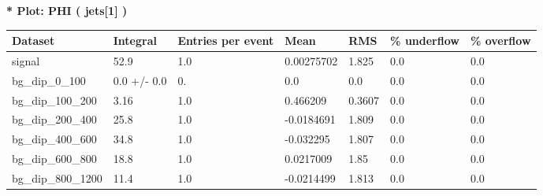\documentclass[a4paper, 10pt]{article}
\begin{document}
\textbf{* Plot: PHI ( jets[1] ) }\\
   \begin{table}[H]
  \begin{center}
    \begin{tabular}{|m{23.0mm}|m{23.0mm}|m{18.0mm}|m{19.0mm}|m{19.0mm}|m{19.0mm}|m{19.0mm}|}
      \hline
      {\cellcolor{yellow}         Dataset}& {\cellcolor{yellow}         Integral}& {\cellcolor{yellow}         Entries per event}& {\cellcolor{yellow}         Mean}& {\cellcolor{yellow}         RMS}& {\cellcolor{yellow}         \% underflow}& {\cellcolor{yellow}         \% overflow}\\
      \hline
      {\cellcolor{white}         signal}& {\cellcolor{white}         52.9}& {\cellcolor{white}         1.0}& {\cellcolor{white}         0.00275702}& {\cellcolor{white}         1.825}& {\cellcolor{green}         0.0}& {\cellcolor{green}         0.0}\\
      \hline
      {\cellcolor{white}         bg\_dip\_0\_100}& {\cellcolor{white}         0.0 +/\-- 0.0}& {\cellcolor{white}         0.}& {\cellcolor{white}         0.0}& {\cellcolor{white}         0.0}& {\cellcolor{green}         0.0}& {\cellcolor{green}         0.0}\\
      \hline
      {\cellcolor{white}         bg\_dip\_100\_200}& {\cellcolor{white}         3.16}& {\cellcolor{white}         1.0}& {\cellcolor{white}         0.466209}& {\cellcolor{white}         0.3607}& {\cellcolor{green}         0.0}& {\cellcolor{green}         0.0}\\
      \hline
      {\cellcolor{white}         bg\_dip\_200\_400}& {\cellcolor{white}         25.8}& {\cellcolor{white}         1.0}& {\cellcolor{white}         -0.0184691}& {\cellcolor{white}         1.809}& {\cellcolor{green}         0.0}& {\cellcolor{green}         0.0}\\
      \hline
      {\cellcolor{white}         bg\_dip\_400\_600}& {\cellcolor{white}         34.8}& {\cellcolor{white}         1.0}& {\cellcolor{white}         -0.032295}& {\cellcolor{white}         1.807}& {\cellcolor{green}         0.0}& {\cellcolor{green}         0.0}\\
      \hline
      {\cellcolor{white}         bg\_dip\_600\_800}& {\cellcolor{white}         18.8}& {\cellcolor{white}         1.0}& {\cellcolor{white}         0.0217009}& {\cellcolor{white}         1.85}& {\cellcolor{green}         0.0}& {\cellcolor{green}         0.0}\\
      \hline
      {\cellcolor{white}         bg\_dip\_800\_1200}& {\cellcolor{white}         11.4}& {\cellcolor{white}         1.0}& {\cellcolor{white}         -0.0214499}& {\cellcolor{white}         1.813}& {\cellcolor{green}         0.0}& {\cellcolor{green}         0.0}\\

\end{tabular}
\end{center}
\end{table}
\end{document}
